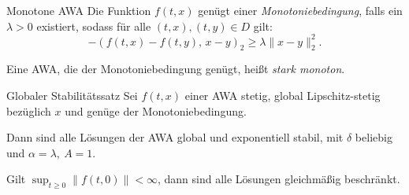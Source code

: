\begin{definition}{Monotone AWA}
     Die Funktion $f(t,x)$ genügt einer \emph{Monotoniebedingung}, falls ein $\lambda>0$ existiert, sodass für alle $(t,x),(t,y)\in D$ gilt:
    $$
    -(f(t,x)-f(t,y),\,x-y)_{2}\ge \lambda\|x-y\|_{2}^{2}.
    $$

    \vspace{1ex}

     Eine AWA, die der Monotoniebedingung genügt, heißt \emph{stark monoton}.
\end{definition}

\begin{satz}{Globaler Stabilitätssatz}
    Sei $f(t,x)$ einer AWA stetig, global Lipschitz-stetig bezüglich $x$ und genüge der Monotoniebedingung.
    \vspace{1em}

    Dann sind alle Lösungen der AWA global und exponentiell stabil, mit $\delta$ beliebig und $\alpha=\lambda,\ A=1$.
    \vspace{1em}

    Gilt $\sup_{t\ge 0}\lVert f(t,0)\rVert<\infty$, dann sind alle Lösungen gleichmäßig beschränkt.    
\end{satz}